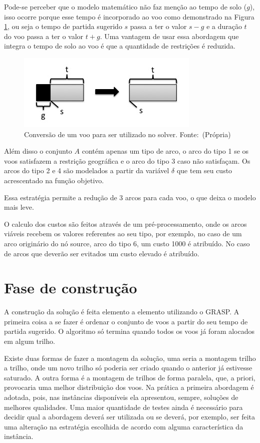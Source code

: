 \clearpage

Pode-se perceber que o modelo matemático não faz menção ao tempo de solo ($g$),
isso ocorre porque esse tempo é incorporado ao voo como demonstrado na Figura
\ref{fig:conversion}, ou seja o tempo de partida sugerido $s$ passa a ter o
valor $s - g$ e a duração $t$ do voo passa a ter o valor $t + g$. Uma vantagem
de usar essa abordagem que integra o tempo de solo ao voo é que a quantidade de
restrições é reduzida.

\begin{figure}[ht]
	\centering
	\caption{Conversão de um voo para ser utilizado no
	solver. \mbox{Fonte: (Própria)}}\label{fig:conversion}
	\includegraphics[scale=0.4]{./img/conversion}
	
\end{figure}

Além disso o conjunto $A$ contém apenas um tipo de arco, o arco do tipo 1 se os
voos satisfazem a restrição geográfica e o arco do tipo 3 caso não satisfaçam.
Os arcos do tipo 2 e 4 são modelados a partir  da variável $\delta$ que tem seu
custo acrescentado na função objetivo.

Essa estratégia permite a redução de 3 arcos para cada voo, o que deixa o
modelo mais leve.

O calculo dos custos são feitos através de um pré-processamento, onde os arcos
viáveis recebem os valores referentes ao seu tipo, por exemplo, no caso de um
arco originário do nó source, arco do tipo 6, um custo 1000 é atribuído. No
caso de arcos que deverão ser evitados um custo elevado é atribuído.
  	
  
\section{Fase de construção}
  
  A construção da solução é feita elemento a elemento utilizando o
  GRASP. A primeira coisa a se fazer é ordenar o conjunto de voos a partir do
  seu tempo de partida sugerido. O algoritmo só termina quando todos os voos já
  foram alocados em algum trilho.
  
  Existe duas formas de fazer a montagem da solução, uma seria a montagem
  trilho a trilho, onde um novo trilho só poderia ser criado quando o anterior
  já estivesse saturado. A outra forma é a montagem de trilhos de forma
  paralela, que, a priori, provocaria uma melhor distribuição dos voos. Na
  prática a primeira abordagem é adotada, pois, nas instâncias disponíveis ela
  apresentou, sempre, soluções de melhores qualidades. Uma maior quantidade de
  testes ainda é necessário para decidir qual a abordagem deverá ser utilizada
  ou se deverá, por exemplo, ser feita uma alteração na estratégia escolhida de
  acordo com alguma característica da instância.
  

